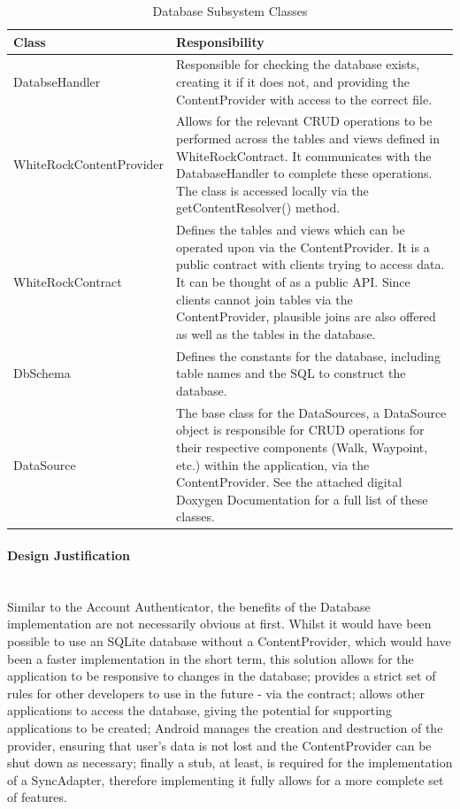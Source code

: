 \documentclass[11pt,a4paper]{report}
\begin{document}
\begin{longtable}{|p{5cm}|p{10cm}|}
\hline \caption{Database Subsystem Classes - Cont. on Next Page} \endfoot
\hline \caption{Database Subsystem Classes} \label{tab:database} \endlastfoot
\hline
\textbf{Class} & \textbf{Responsibility} \\ \hline
DatabseHandler & Responsible for checking the database exists, creating it if it does not, and providing the ContentProvider with access to the correct file. \\ \hline
WhiteRockContentProvider & Allows for the relevant CRUD operations to be performed across the tables and views defined in WhiteRockContract. It communicates with the DatabaseHandler to complete these operations. The class is accessed locally via the getContentResolver() method.  \\ \hline
WhiteRockContract & Defines the tables and views which can be operated upon via the ContentProvider. It is a public contract with clients trying to access data. It can be thought of as a public API. Since clients cannot join tables via the ContentProvider, plausible joins are also offered as well as the tables in the database. \\ \hline
DbSchema & Defines the constants for the database, including table names and the SQL to construct the database. \\ \hline
DataSource & The base class for the DataSources, a DataSource object is responsible for CRUD operations for their respective components (Walk, Waypoint, etc.) within the application, via the ContentProvider. See the attached digital Doxygen Documentation for a full list of these classes.  \\ \hline
\end{longtable}

\paragraph*{Design Justification}\mbox{}\\ 
Similar to the Account Authenticator, the benefits of the Database implementation are not necessarily obvious at first. Whilst it would have been possible to use an SQLite database without a ContentProvider, which would have been a faster implementation in the short term, this solution allows for the application to be responsive to changes in the database; provides a strict set of rules for other developers to use in the future - via the contract; allows other applications to access the database, giving the potential for supporting applications to be created; Android manages the creation and destruction of the provider, ensuring that user's data is not lost and the ContentProvider can be shut down as necessary; finally a stub, at least, is required for the implementation of a SyncAdapter, therefore implementing it fully allows for a more complete set of features.
\end{document}
